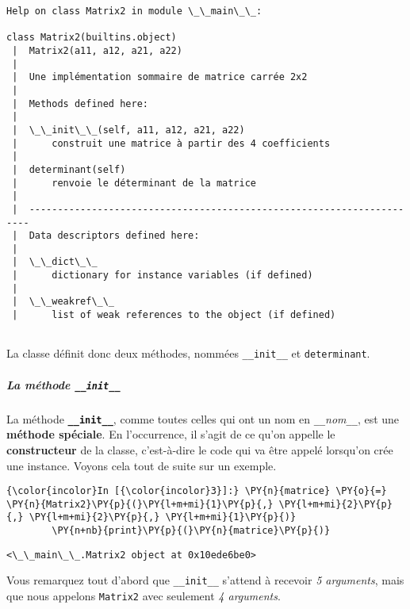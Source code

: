     \begin{Verbatim}[commandchars=\\\{\}]
Help on class Matrix2 in module \_\_main\_\_:

class Matrix2(builtins.object)
 |  Matrix2(a11, a12, a21, a22)
 |  
 |  Une implémentation sommaire de matrice carrée 2x2
 |  
 |  Methods defined here:
 |  
 |  \_\_init\_\_(self, a11, a12, a21, a22)
 |      construit une matrice à partir des 4 coefficients
 |  
 |  determinant(self)
 |      renvoie le déterminant de la matrice
 |  
 |  ----------------------------------------------------------------------
 |  Data descriptors defined here:
 |  
 |  \_\_dict\_\_
 |      dictionary for instance variables (if defined)
 |  
 |  \_\_weakref\_\_
 |      list of weak references to the object (if defined)


    \end{Verbatim}

    La classe définit donc deux méthodes, nommées \texttt{\_\_init\_\_} et
\texttt{determinant}.

    \hypertarget{la-muxe9thode-__init__}{%
\subparagraph{\texorpdfstring{La méthode
\texttt{\_\_init\_\_}}{La méthode \_\_init\_\_}}\label{la-muxe9thode-__init__}}

    La méthode \textbf{\texttt{\_\_init\_\_}}, comme toutes celles qui ont
un nom en \texttt{\_\_}\emph{nom}\texttt{\_\_}, est une \textbf{méthode
spéciale}. En l'occurrence, il s'agit de ce qu'on appelle le
\textbf{constructeur} de la classe, c'est-à-dire le code qui va être
appelé lorsqu'on crée une instance. Voyons cela tout de suite sur un
exemple.

    \begin{Verbatim}[commandchars=\\\{\}]
{\color{incolor}In [{\color{incolor}3}]:} \PY{n}{matrice} \PY{o}{=} \PY{n}{Matrix2}\PY{p}{(}\PY{l+m+mi}{1}\PY{p}{,} \PY{l+m+mi}{2}\PY{p}{,} \PY{l+m+mi}{2}\PY{p}{,} \PY{l+m+mi}{1}\PY{p}{)}
        \PY{n+nb}{print}\PY{p}{(}\PY{n}{matrice}\PY{p}{)}
\end{Verbatim}


    \begin{Verbatim}[commandchars=\\\{\}]
<\_\_main\_\_.Matrix2 object at 0x10ede6be0>

    \end{Verbatim}

    Vous remarquez tout d'abord que \texttt{\_\_init\_\_} s'attend à
recevoir \emph{5 arguments}, mais que nous appelons \texttt{Matrix2}
avec seulement \emph{4 arguments}.


